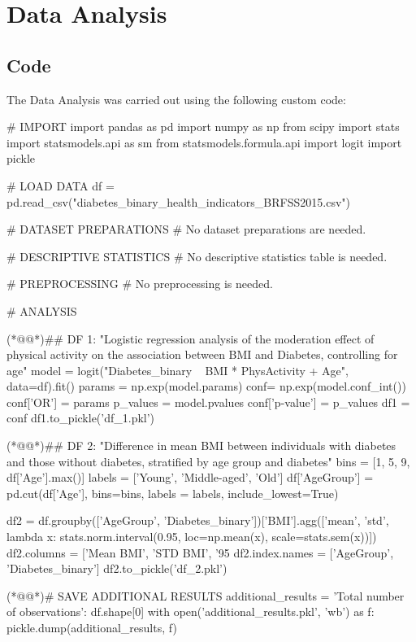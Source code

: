 \documentclass[11pt]{article}
\begin{document}
\section{Data Analysis}
\subsection{{Code}}
The Data Analysis was carried out using the following custom code:

\begin{python}

# IMPORT
import pandas as pd
import numpy as np
from scipy import stats
import statsmodels.api as sm
from statsmodels.formula.api import logit
import pickle

# LOAD DATA
df = pd.read_csv("diabetes_binary_health_indicators_BRFSS2015.csv")

# DATASET PREPARATIONS
# No dataset preparations are needed.

# DESCRIPTIVE STATISTICS
# No descriptive statistics table is needed.

# PREPROCESSING
# No preprocessing is needed.

# ANALYSIS

(*@@*)## DF 1: "Logistic regression analysis of the moderation effect of physical activity on the association between BMI and Diabetes, controlling for age"
model = logit("Diabetes_binary ~ BMI * PhysActivity + Age", data=df).fit()
params = np.exp(model.params)
conf= np.exp(model.conf_int())
conf['OR'] = params
p_values = model.pvalues
conf['p-value'] = p_values
df1 = conf
df1.to_pickle('df_1.pkl')  

(*@@*)## DF 2: "Difference in mean BMI between individuals with diabetes and those without diabetes, stratified by age group and diabetes"
bins = [1, 5, 9, df['Age'].max()]
labels = ['Young', 'Middle-aged', 'Old']
df['AgeGroup'] = pd.cut(df['Age'], bins=bins, labels = labels, include_lowest=True)

df2 = df.groupby(['AgeGroup', 'Diabetes_binary'])['BMI'].agg(['mean', 'std', lambda x: stats.norm.interval(0.95, loc=np.mean(x), scale=stats.sem(x))])
df2.columns = ['Mean BMI', 'STD BMI', '95%
df2.index.names = ['AgeGroup', 'Diabetes_binary']
df2.to_pickle('df_2.pkl')  

(*@@*)# SAVE ADDITIONAL RESULTS
additional_results = {
    'Total number of observations': df.shape[0]
}
with open('additional_results.pkl', 'wb') as f:
    pickle.dump(additional_results, f)

\end{python}
\end{document}
